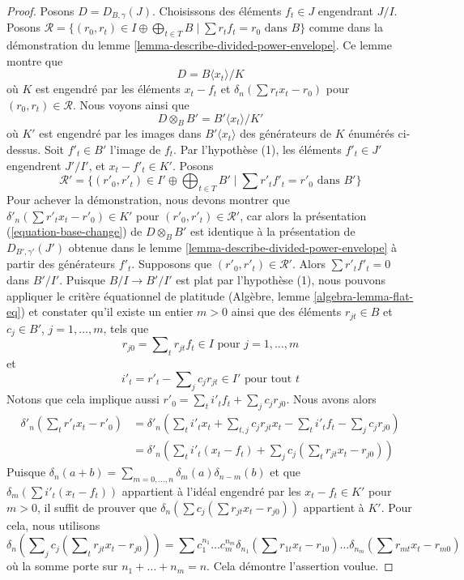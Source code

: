 \begin{proof}
Posons $D = D_{B, \gamma}(J)$. Choisissons des éléments $f_t \in J$ engendrant $J/I$.
Posons $\mathcal{R} = \{(r_0, r_t) \in I \oplus \bigoplus\nolimits_{t \in T} B
\mid \sum r_t f_t = r_0 \text{ dans }B\}$ comme dans la démonstration du
lemme \ref{lemma-describe-divided-power-envelope}. Ce lemme montre que
$$
D = B\langle x_t \rangle/ K
$$
où $K$ est engendré par les éléments $x_t - f_t$ et
$\delta_n(\sum r_t x_t - r_0)$ pour $(r_0, r_t) \in \mathcal{R}$.
Nous voyons ainsi que
\begin{equation}
\label{equation-base-change}
D \otimes_B B' = B'\langle x_t \rangle/K'
\end{equation}
où $K'$ est engendré par les images dans $B'\langle x_t \rangle$
des générateurs de $K$ énumérés ci-dessus. Soit $f'_t \in B'$ l'image
de $f_t$. Par l'hypothèse (1), les éléments $f'_t \in J'$
engendrent $J'/I'$, et $x_t - f'_t \in K'$. Posons
$$
\mathcal{R}' =
\{(r'_0, r'_t) \in I' \oplus \bigoplus\nolimits_{t \in T} B'
\mid \sum r'_t f'_t = r'_0 \text{ dans }B'\}
$$
Pour achever la démonstration, nous devons montrer que
$\delta'_n(\sum r'_t x_t - r'_0) \in K'$
pour $(r'_0, r'_t) \in \mathcal{R}'$, car alors la présentation
(\ref{equation-base-change}) de $D \otimes_B B'$ est identique
à la présentation de $D_{B', \gamma'}(J')$ obtenue dans le
lemme \ref{lemma-describe-divided-power-envelope} à partir des générateurs $f'_t$.
Supposons que $(r'_0, r'_t) \in \mathcal{R}'$. Alors
$\sum r'_t f'_t = 0$ dans $B'/I'$. Puisque $B/I \to B'/I'$ est plat par
l'hypothèse (1), nous pouvons appliquer le critère équationnel de platitude
(Algèbre, lemme \ref{algebra-lemma-flat-eq}) et constater
qu'il existe un entier $m > 0$ ainsi que des éléments
$r_{jt} \in B$ et $c_j \in B'$, $j = 1, \ldots, m$, tels
que
$$
r_{j0} = \sum\nolimits_t r_{jt} f_t  \in I \text{ pour } j = 1, \ldots, m
$$
et
$$
i'_t  = r'_t - \sum\nolimits_j c_j r_{jt} \in I' \text{ pour tout }t
$$
Notons que cela implique aussi
$r'_0 = \sum_t i'_t f_t + \sum_j c_j r_{j0}$.
Nous avons alors
\begin{align*}
\delta'_n(\sum\nolimits_t r'_t x_t  - r'_0)
& =
\delta'_n(
\sum\nolimits_t i'_t x_t +
\sum\nolimits_{t, j} c_j r_{jt} x_t -
\sum\nolimits_t i'_t f_t -
\sum\nolimits_j c_j r_{j0}) \\
& =
\delta'_n(
\sum\nolimits_t i'_t(x_t - f_t) +
\sum\nolimits_j c_j (\sum\nolimits_t r_{jt} x_t  - r_{j0}))
\end{align*}
Puisque $\delta_n(a + b) = \sum_{m = 0, \ldots, n} \delta_m(a) \delta_{n - m}(b)$
et que $\delta_m(\sum i'_t(x_t - f_t))$ appartient à l'idéal
engendré par les $x_t - f_t \in K'$ pour $m > 0$, il suffit de prouver que
$\delta_n(\sum c_j (\sum r_{jt} x_t  - r_{j0}))$ appartient à $K'$.
Pour cela, nous utilisons
$$
\delta_n(\sum\nolimits_j c_j (\sum\nolimits_t r_{jt} x_t  - r_{j0}))
=
\sum c_1^{n_1} \ldots c_m^{n_m}
\delta_{n_1}(\sum r_{1t} x_t  - r_{10}) \ldots
\delta_{n_m}(\sum r_{mt} x_t  - r_{m0})
$$
où la somme porte sur $n_1 + \ldots + n_m = n$. Cela démontre l'assertion voulue.
\end{proof}





